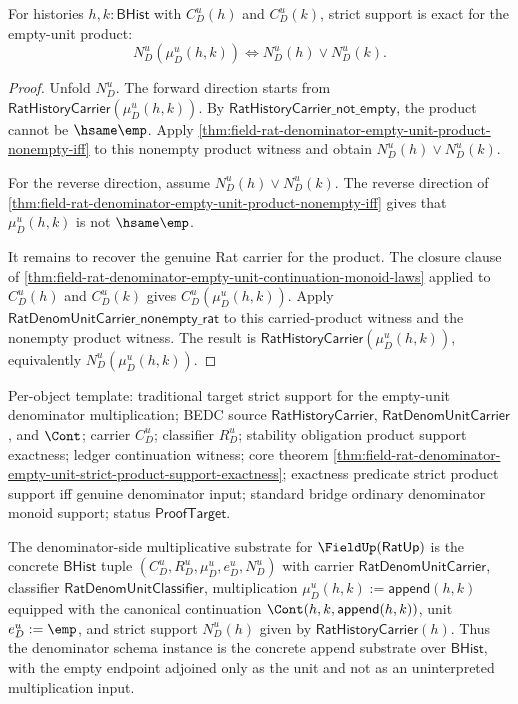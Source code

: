 \begin{theorem}
\label{thm:field-rat-denominator-empty-unit-strict-product-support-exactness}
For histories $h,k:\mathsf{BHist}$ with $C_D^u(h)$ and $C_D^u(k)$, strict
support is exact for the empty-unit product:
$$
N_D^u(\mu_D^u(h,k))
\Longleftrightarrow
N_D^u(h)\lor N_D^u(k).
$$
\end{theorem}
\begin{proof}
Unfold $N_D^u$. The forward direction starts from
$\mathsf{RatHistoryCarrier}(\mu_D^u(h,k))$. By
$\mathsf{RatHistoryCarrier\_not\_empty}$, the product cannot be
$\hsame\emp$. Apply
\autoref{thm:field-rat-denominator-empty-unit-product-nonempty-iff} to this
nonempty product witness and obtain $N_D^u(h)\lor N_D^u(k)$.

For the reverse direction, assume $N_D^u(h)\lor N_D^u(k)$. The reverse
direction of
\autoref{thm:field-rat-denominator-empty-unit-product-nonempty-iff} gives
that $\mu_D^u(h,k)$ is not $\hsame\emp$.

It remains to recover the genuine Rat carrier for the product. The closure
clause of
\autoref{thm:field-rat-denominator-empty-unit-continuation-monoid-laws}
applied to $C_D^u(h)$ and $C_D^u(k)$ gives
$C_D^u(\mu_D^u(h,k))$. Apply
$\mathsf{RatDenomUnitCarrier\_nonempty\_rat}$ to this carried-product witness
and the nonempty product witness. The result is
$\mathsf{RatHistoryCarrier}(\mu_D^u(h,k))$, equivalently
$N_D^u(\mu_D^u(h,k))$.
\end{proof}

Per-object template: traditional target strict support for the empty-unit
denominator multiplication; BEDC source $\mathsf{RatHistoryCarrier}$,
$\mathsf{RatDenomUnitCarrier}$, and $\Cont$; carrier $C_D^u$; classifier
$R_D^u$; stability obligation product support exactness; ledger continuation
witness; core theorem
\autoref{thm:field-rat-denominator-empty-unit-strict-product-support-exactness};
exactness predicate strict product support iff genuine denominator input;
standard bridge ordinary denominator monoid support; status
$\mathsf{ProofTarget}$.

\begin{definition}
\label{def:field-rat-denominator-empty-unit-multiplicative-substrate}
The denominator-side multiplicative substrate for
$\FieldUp(\mathsf{RatUp})$ is the concrete $\mathsf{BHist}$ tuple
$(C_D^u,R_D^u,\mu_D^u,e_D^u,N_D^u)$ with carrier
$\mathsf{RatDenomUnitCarrier}$, classifier
$\mathsf{RatDenomUnitClassifier}$, multiplication
$\mu_D^u(h,k):=\mathsf{append}(h,k)$ equipped with the canonical continuation
$\Cont(h,k,\mathsf{append}(h,k))$, unit $e_D^u:=\emp$, and strict support
$N_D^u(h)$ given by $\mathsf{RatHistoryCarrier}(h)$. Thus the denominator
schema instance is the concrete append substrate over $\mathsf{BHist}$, with
the empty endpoint adjoined only as the unit and not as an uninterpreted
multiplication input.
\end{definition}

